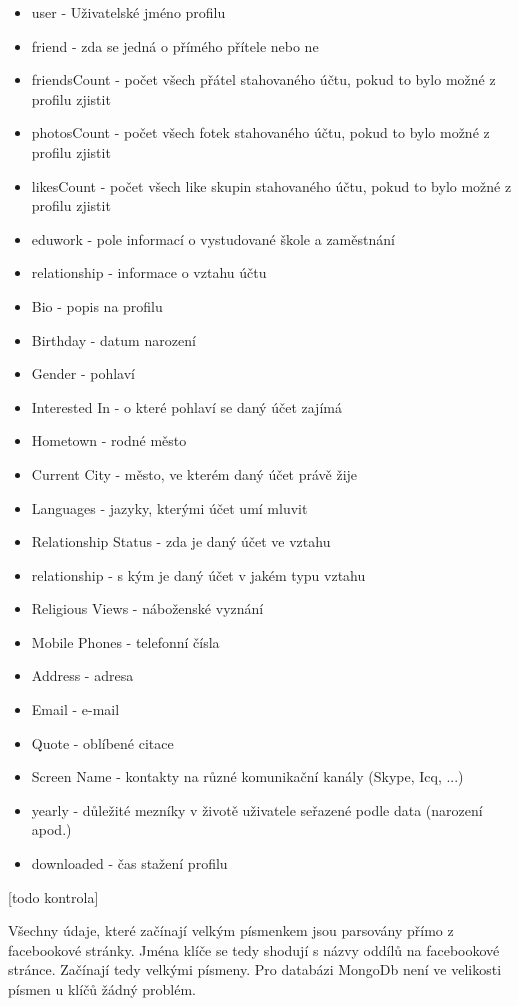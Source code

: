 \documentclass[thesis=M,czech]{FITthesis}[2013/05/10]
\begin{document}
\begin{itemize}
  \item user - Uživatelské jméno profilu
  \item friend - zda se jedná o přímého přítele nebo ne
  \item friendsCount - počet všech přátel stahovaného účtu, pokud to bylo možné z profilu zjistit
  \item photosCount - počet všech fotek stahovaného účtu, pokud to bylo možné z profilu zjistit
  \item likesCount - počet všech like skupin stahovaného účtu, pokud to bylo možné z profilu zjistit
  \item eduwork - pole informací o vystudované škole a zaměstnání
  \item relationship - informace o vztahu účtu
  \item Bio - popis na profilu
  \item Birthday - datum narození 
  \item Gender - pohlaví
  \item Interested In - o které pohlaví se daný účet zajímá
  \item Hometown - rodné město
  \item Current City - město, ve kterém daný účet právě žije
  \item Languages - jazyky, kterými účet umí mluvit
  \item Relationship Status - zda je daný účet ve vztahu
  \item relationship - s kým je daný účet v jakém typu vztahu
  \item Religious Views - náboženské vyznání
  \item Mobile Phones - telefonní čísla
  \item Address - adresa
  \item Email - e-mail
  \item Quote - oblíbené citace
  \item Screen Name - kontakty na různé komunikační kanály (Skype, Icq, ...)
  \item yearly - důležité mezníky v životě uživatele seřazené podle data (narození apod.)
  \item downloaded - čas stažení profilu
\end{itemize}
[todo kontrola]

Všechny údaje, které začínají velkým písmenkem jsou parsovány přímo z facebookové stránky. Jména klíče se tedy shodují s názvy oddílů na facebookové stránce. Začínají tedy velkými písmeny. Pro databázi MongoDb není ve velikosti písmen u klíčů žádný problém.
\end{document}
